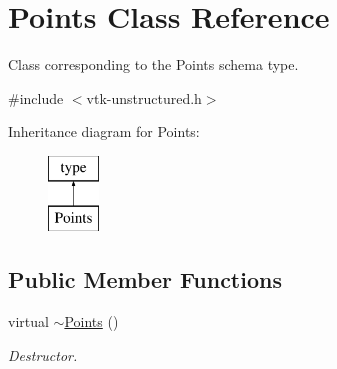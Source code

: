 \hypertarget{classPoints}{\section{Points Class Reference}
\label{classPoints}
}


Class corresponding to the Points schema type.  




{\ttfamily \#include $<$vtk-\/unstructured.\-h$>$}

Inheritance diagram for Points\-:\begin{figure}[H]
\begin{center}
\leavevmode
\includegraphics[height=2.000000cm]{classPoints}
\end{center}
\end{figure}
\subsection*{Public Member Functions}
\begin{DoxyCompactItemize}
\item 
virtual \hyperlink{classPoints_a9d56d7dc8b6a6f492e07d354eb379c12}{$\sim$\-Points} ()
\begin{DoxyCompactList}\small\item\em Destructor. \end{DoxyCompactList}\end{DoxyCompactItemize}
